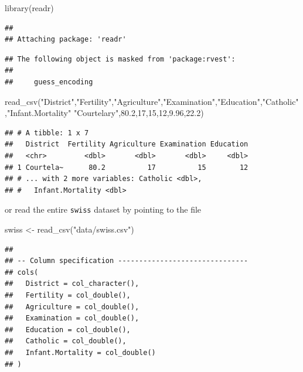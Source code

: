 \documentclass[
  12pt,
]{style/krantz}
\newenvironment{Shaded}{\begin{snugshade}}{\end{snugshade}}
\newcommand{\FunctionTok}[1]{\textcolor[rgb]{0.00,0.00,0.00}{#1}}
\newcommand{\NormalTok}[1]{#1}
\newcommand{\OtherTok}[1]{\textcolor[rgb]{0.56,0.35,0.01}{#1}}
\newcommand{\StringTok}[1]{\textcolor[rgb]{0.31,0.60,0.02}{#1}}
\begin{document}
\begin{Shaded}
\begin{Highlighting}[]
\FunctionTok{library}\NormalTok{(readr)}
\end{Highlighting}
\end{Shaded}

\begin{verbatim}
## 
## Attaching package: 'readr'
\end{verbatim}

\begin{verbatim}
## The following object is masked from 'package:rvest':
## 
##     guess_encoding
\end{verbatim}

\begin{Shaded}
\begin{Highlighting}[]
\FunctionTok{read\_csv}\NormalTok{(}\StringTok{\textquotesingle{}"District","Fertility","Agriculture","Examination","Education","Catholic","Infant.Mortality"}
\StringTok{"Courtelary",80.2,17,15,12,9.96,22.2\textquotesingle{}}\NormalTok{)}
\end{Highlighting}
\end{Shaded}

\begin{verbatim}
## # A tibble: 1 x 7
##   District  Fertility Agriculture Examination Education
##   <chr>         <dbl>       <dbl>       <dbl>     <dbl>
## 1 Courtela~      80.2          17          15        12
## # ... with 2 more variables: Catholic <dbl>,
## #   Infant.Mortality <dbl>
\end{verbatim}

or read the entire \texttt{swiss} dataset by pointing to the file

\begin{Shaded}
\begin{Highlighting}[]
\NormalTok{swiss }\OtherTok{\textless{}{-}} \FunctionTok{read\_csv}\NormalTok{(}\StringTok{"data/swiss.csv"}\NormalTok{)}
\end{Highlighting}
\end{Shaded}

\begin{verbatim}
## 
## -- Column specification -------------------------------
## cols(
##   District = col_character(),
##   Fertility = col_double(),
##   Agriculture = col_double(),
##   Examination = col_double(),
##   Education = col_double(),
##   Catholic = col_double(),
##   Infant.Mortality = col_double()
## )
\end{verbatim}
\end{document}
